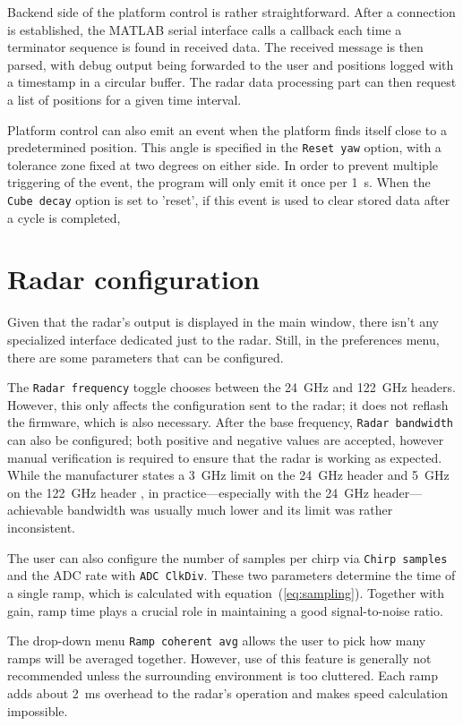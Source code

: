 Backend side of the platform control is rather straightforward.
After a connection is established, the MATLAB serial interface calls a callback each time a terminator sequence is found in received data.
The received message is then parsed, with debug output being forwarded to the user and positions logged with a timestamp in a circular buffer.
The radar data processing part can then request a list of positions for a given time interval.

Platform control can also emit an event when the platform finds itself close to a predetermined position.
This angle is specified in the \texttt{Reset yaw} option, with a tolerance zone fixed at two degrees on either side.
In order to prevent multiple triggering of the event, the program will only emit it once per 1~s.
When the \texttt{Cube decay} option is set to 'reset', if this event is used to clear stored data after a cycle is completed,

\section{Radar configuration}

Given that the radar's output is displayed in the main window, there isn't any specialized interface dedicated just to the radar.
Still, in the preferences menu, there are some parameters that can be configured.

The \texttt{Radar frequency} toggle chooses between the 24~GHz and 122~GHz headers.
However, this only affects the configuration sent to the radar; it does not reflash the firmware, which is also necessary.
After the base frequency, \texttt{Radar bandwidth} can also be configured; both positive and negative values are accepted, however manual verification is required to ensure that the radar is working as expected.
While the manufacturer states a 3~GHz limit on the 24~GHz header and 5~GHz on the 122~GHz header \cite{siradPRO}, in practice—especially with the 24~GHz header—achievable bandwidth was usually much lower and its limit was rather inconsistent.

The user can also configure the number of samples per chirp via \texttt{Chirp samples} and the ADC rate with \texttt{ADC ClkDiv}.
These two parameters determine the time of a single ramp, which is calculated with equation~(\ref{eq:sampling}).
Together with gain, ramp time plays a crucial role in maintaining a good signal-to-noise ratio.

The drop-down menu \texttt{Ramp coherent avg} allows the user to pick how many ramps will be averaged together.
However, use of this feature is generally not recommended unless the surrounding environment is too cluttered.
Each ramp adds about 2~ms overhead to the radar's operation and makes speed calculation impossible.

